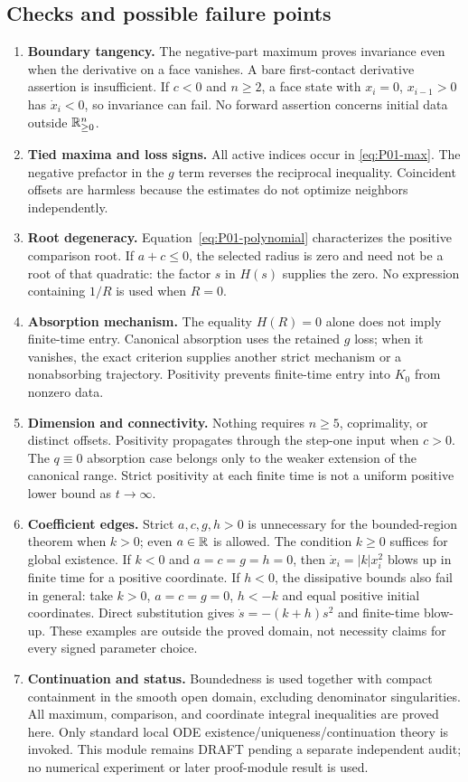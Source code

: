 \subsection{Checks and possible failure points}
\begin{enumerate}[leftmargin=*]
\item \textbf{Boundary tangency.} The negative-part maximum proves
invariance even when the derivative on a face vanishes. A bare
first-contact derivative assertion is insufficient. If $c<0$ and
$n\ge2$, a face state with $x_i=0$, $x_{i-1}>0$ has $\dot x_i<0$,
so invariance can fail. No forward assertion concerns initial data
outside $\mathbb{R}_{\geq 0}^{n}$.
\item \textbf{Tied maxima and loss signs.} All active indices occur
in \eqref{eq:P01-max}. The negative prefactor in the $g$ term reverses
the reciprocal inequality. Coincident offsets are harmless because
the estimates do not optimize neighbors independently.
\item \textbf{Root degeneracy.} Equation~\eqref{eq:P01-polynomial}
characterizes the positive comparison root. If $a+c\le0$, the selected
radius is zero and need not be a root of that quadratic: the factor
$s$ in $H(s)$ supplies the zero. No expression containing $1/R$ is
used when $R=0$.
\item \textbf{Absorption mechanism.} The equality $H(R)=0$ alone
does not imply finite-time entry. Canonical absorption uses the
retained $g$ loss; when it vanishes, the exact criterion supplies
another strict mechanism or a nonabsorbing trajectory. Positivity
prevents finite-time entry into $K_0$ from nonzero data.
\item \textbf{Dimension and connectivity.} Nothing requires
$n\ge5$, coprimality, or distinct offsets. Positivity propagates
through the step-one input when $c>0$. The $q\equiv0$ absorption
case belongs only to the weaker extension of the canonical range.
Strict positivity at each finite time is not a uniform positive
lower bound as $t\to\infty$.
\item \textbf{Coefficient edges.} Strict $a,c,g,h>0$ is unnecessary
for the bounded-region theorem when $k>0$; even $a\in\mathbb{R}$ is allowed.
The condition $k\ge0$ suffices for global existence. If $k<0$ and
$a=c=g=h=0$, then $\dot x_i=|k|x_i^2$ blows up in finite time for
a positive coordinate. If $h<0$, the dissipative bounds also fail
in general: take $k>0$, $a=c=g=0$, $h<-k$ and equal positive initial
coordinates. Direct substitution gives $\dot s=-(k+h)s^2$ and
finite-time blow-up. These examples are outside the proved domain,
not necessity claims for every signed parameter choice.
\item \textbf{Continuation and status.} Boundedness is used together
with compact containment in the smooth open domain, excluding
denominator singularities. All maximum, comparison, and coordinate
integral inequalities are proved here. Only standard local ODE
existence/uniqueness/continuation theory is invoked. This module
remains DRAFT pending a separate independent audit; no numerical
experiment or later proof-module result is used.
\end{enumerate}
